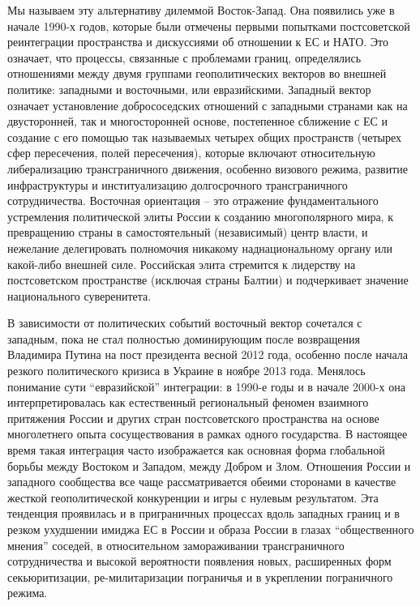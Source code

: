 \documentclass[]{book}
\begin{document}
Мы называем эту альтернативу дилеммой Восток-Запад. Она появились уже в
начале 1990-х годов, которые были отмечены первыми попытками
постсоветской реинтеграции пространства и дискуссиями об отношении к ЕС
и НАТО. Это означает, что процессы, связанные с проблемами границ,
определялись отношениями между двумя группами геополитических векторов
во внешней политике: западными и восточными, или евразийскими. Западный
вектор означает установление добрососедских отношений с западными
странами как на двусторонней, так и многосторонней основе, постепенное
сближение с ЕС и создание с его помощью так называемых четырех общих
пространств (четырех сфер пересечения, полей пересечения), которые
включают относительную либерализацию трансграничного движения, особенно
визового режима, развитие инфраструктуры и институализацию долгосрочного
трансграничного сотрудничества. Восточная ориентация -- это отражение
фундаментального устремления политической элиты России к созданию
многополярного мира, к превращению страны в самостоятельный
(независимый) центр власти, и нежелание делегировать полномочия никакому
наднациональному органу или какой-либо внешней силе. Российская элита
стремится к лидерству на постсоветском пространстве (исключая страны
Балтии) и подчеркивает значение национального суверенитета.

В зависимости от политических событий восточный вектор сочетался с
западным, пока не стал полностью доминирующим после возвращения
Владимира Путина на пост президента весной 2012 года, особенно после
начала резкого политического кризиса в Украине в ноябре 2013 года.
Менялось понимание сути ``евразийской'' интеграции: в 1990-е годы и в
начале 2000-х она интерпретировалась как естественный региональный
феномен взаимного притяжения России и других стран постсоветского
пространства на основе многолетнего опыта сосуществования в рамках
одного государства. В настоящее время такая интеграция часто
изображается как основная форма глобальной борьбы между Востоком и
Западом, между Добром и Злом. Отношения России и западного сообщества
все чаще рассматривается обеими сторонами в качестве жесткой
геополитической конкуренции и игры с нулевым результатом. Эта тенденция
проявилась и в приграничных процессах вдоль западных границ и в резком
ухудшении имиджа ЕС в России и образа России в глазах ``общественного
мнения'' соседей, в относительном замораживании трансграничного
сотрудничества и высокой вероятности появления новых, расширенных форм
секьюритизации, ре-милитаризации пограничья и в укреплении пограничного
режима.
\end{document}
